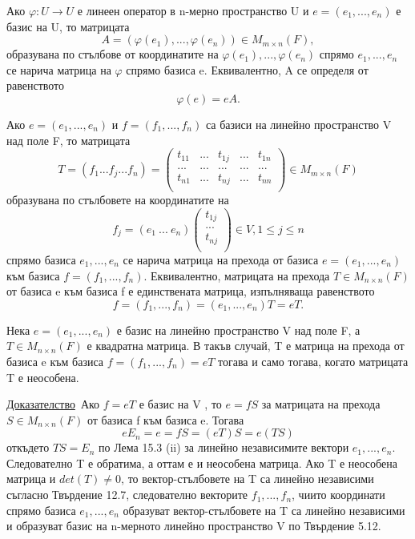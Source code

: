 \documentclass{article}
\newcommand{\dok}{\underline{Доказателство}\  }
\newcommand{\tvurdenie}[2]{
    \begin{tcolorbox}[title = #1 ,colframe = blue!70!black, colback = blue!10!white]
        #2
    \end{tcolorbox}
}
\newcommand{\opredelenie}[2]{
    \begin{tcolorbox}[title = #1 ,colframe = red!70!black, colback = red!10!white]
        #2
    \end{tcolorbox}
}
\begin{document}
\opredelenie{Определение 15.4}{
    Ако $\varphi : U \rightarrow U$ е линеен оператор в n-мерно пространство U и $e = (e_1, . . . , e_n)$ е базис на U, то матрицата
    \[
        A = (\varphi(e_1), . . . , \varphi(e_n)) \in M_{m\times n}(F),
    \]
    образувана по стълбове от координатите на $\varphi(e_1), . . . , \varphi(e_n)$ спрямо
    $e_1, . . . , e_n$ се нарича матрица на $\varphi$ спрямо базиса e.
    Еквивалентно, A се определя от равенството
    \[
        \varphi(e) = eA.
    \]
}
\opredelenie{Определение 15.5}{
    Ако $e = (e_1, . . . , e_n)$ и $f = (f_1, . . . , f_n)$ са базиси на
    линейно пространство V над поле F, то матрицата
    \[
        T=(f_1 ... f_j ... f_n)=\left(\begin{array}{ccccc}
                t_{11} & ... & t_{1j} & ... & t_{1n} \\
                ...    & ... & ...    & ... & ...    \\
                t_{n1} & ... & t_{nj} & ... & t_{nn} \\
            \end{array}
        \right)\in M_{m\times n}(F)
    \]
    образувана по стълбовете на координатите на
    \[
        f_j=(e_1 \ ... \ e_n)\left(\begin{array}{c}
                t_{1j} \\
                ...    \\
                t_{nj} \\
            \end{array}
        \right)\in V, 1 \leq j \leq n
    \]
    спрямо базиса $e_1, . . . , e_n$ се нарича матрица на прехода от базиса
    $e = (e_1, . . . , e_n)$ към базиса $f = (f_1, . . . , f_n)$. Еквивалентно, матрицата на
    прехода $T \in M_{n\times n}(F)$ от базиса e към базиса f е единствената матрица, изпълняваща равенството
    \[
        f = (f_1, . . . , f_n) = (e_1, . . . , e_n)T = eT.
    \]
}
\tvurdenie{Твърдение 15.6}{
    Нека $e = (e_1, . . . , e_n)$ е базис на линейно пространство V над поле F, а $T \in M_{n\times n}(F)$ е квадратна матрица. В такъв случай,
    T е матрица на прехода от базиса e към базиса $f = (f_1, . . . , f_n) = eT$
    тогава и само тогава, когато матрицата T е неособена.
}
\dok Ако $f = eT$ е базис на V , то $e = fS$ за матрицата на
прехода $S \in M_{n\times n}(F)$ от базиса f към базиса e. Тогава
\[
    eE_n = e = fS = (eT)S = e(TS)
\]
откъдето $TS = E_n$ по Лема 15.3 (ii) за линейно независимите вектори $e_1, . . . , e_n$.
Следователно T е обратима, а оттам е и неособена матрица. Ако T е неособена матрица и $det(T)\neq 0$, то вектор-стълбовете на T са линейно
независими съгласно Твърдение 12.7, следователно векторите $f_1, . . . , f_n$, чиито координати спрямо базиса $e_1, . . . , e_n$ образуват вектор-стълбовете на T са
линейно независими и образуват базис на n-мерното линейно пространство V по Твърдение 5.12.
\end{document}
